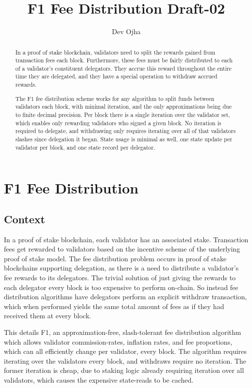 \documentclass[]{article}
\title{F1 Fee Distribution Draft-02}
\author{Dev Ojha}
\begin{document}
\maketitle

\begin{abstract}
	In a proof of stake blockchain, validators need to split the rewards gained from transaction fees each block. Furthermore, these fees must be fairly distributed to each of a validator's constituent delegators. They accrue this reward throughout the entire time they are delegated, and they have a special operation to withdraw accrued rewards.
	
	The F1 fee distribution scheme works for any algorithm to split funds between validators each block, with minimal iteration, and the only approximations being due to finite decimal precision. Per block there is a single iteration over the validator set, which enables only rewarding validators who signed a given block. No iteration is required to delegate, and withdrawing only requires iterating over all of that validators slashes since delegation it began. State usage is minimal as well, one state update per validator per block, and one state record per delegator.
\end{abstract}

\section{F1 Fee Distribution}

\subsection{Context}
In a proof of stake blockchain, each validator has an associated stake.
Transaction fees get rewarded to validators based on the incentive scheme of the underlying proof of stake model.
The fee distribution problem occurs in proof of stake blockchains supporting delegation, as there is a need to distribute a validator's fee rewards to its delegators.
The trivial solution of just giving the rewards to each delegator every block is too expensive to perform on-chain.
So instead fee distribution algorithms have delegators perform an explicit withdraw transaction, which when performed yields the same total amount of fees as if they had received them at every block. 

This details F1, an approximation-free, slash-tolerant fee distribution algorithm which allows validator commission-rates, inflation rates, and fee proportions, which can all efficiently change per validator, every block.
The algorithm requires iterating over the validators every block, and withdraws require no iteration.
The former iteration is cheap, due to staking logic already requiring iteration over all validators, which causes the expensive state-reads to be cached.
\end{document}
